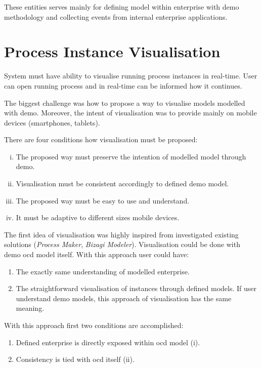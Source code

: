 These entities serves mainly for defining model within enterprise with \gls{demo} methodology and collecting events from internal enterprise applications.

\section{Process Instance Visualisation}
System must have ability to visualise running process instances in real-time. User can open running process and in real-time can be informed how it continues. 

The biggest challenge was how to propose a way to visualise models modelled with \gls{demo}. Moreover, the intent of visualisation was to provide mainly on mobile devices (smartphones, tablets).

There are four conditions how visualisation must be proposed:
\begin{enumerate}[(i)]
	\item The proposed way must preserve the intention of modelled model through \gls{demo}.
    \item Visualisation must be consistent accordingly to defined \gls{demo} model.
    \item The proposed way must be easy to use and understand.  
    \item It must be adaptive to different sizes mobile devices. 
\end{enumerate}

The first idea of visualisation was highly inspired from investigated existing solutions (\textit{Process Maker}, \textit{Bizagi Modeler}). Visualisation could be done with \gls{demo} \gls{ocd} model itself. With this approach user could have:
\begin{enumerate}
\item The exactly same understanding of modelled enterprise.
\item The straightforward visualisation of instances through defined models. If user understand \gls{demo} models, this approach of visualisation has the same meaning.
\end{enumerate}

With this approach first two conditions are accomplished:
\begin{enumerate}
\item Defined enterprise is directly exposed within \gls{ocd} model (i).
\item Consistency is tied with \gls{ocd} itself (ii).
\end{enumerate}

